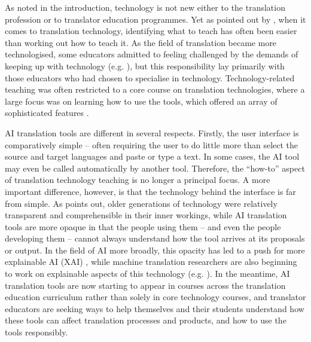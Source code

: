 \documentclass[output=paper]{langscibook}
\begin{document}
As noted in the introduction, technology is not new either to the translation profession or to translator education programmes. Yet as pointed out by \citet{kenny2020}, when it comes to translation technology, identifying what to teach has often been easier than working out how to teach it. As the field of translation became more technologised, some educators admitted to feeling challenged by the demands of keeping up with technology (e.g. \citealt{kenny2007, marshmanbowker12}), but this responsibility lay primarily with those educators who had chosen to specialise in technology. Technology-related teaching was often restricted to a core course on translation technologies, where a large focus was on learning how to use the tools, which offered an array of sophisticated features \citep{bowker2023}.

AI translation tools are different in several respects. Firstly, the user interface is comparatively simple – often requiring the user to do little more than select the source and target languages and paste or type a text. In some cases, the AI tool may even be called automatically by another tool. Therefore, the “how-to” aspect of translation technology teaching is no longer a principal focus. A more important difference, however, is that the technology behind the interface is far from simple. As \citet{kenny2018} points out, older generations of technology were relatively transparent and comprehensible in their inner workings, while AI translation tools are more opaque in that the people using them – and even the people developing them – cannot always understand how the tool arrives at its proposals or output. In the field of AI more broadly, this opacity has led to a push for more explainable AI (XAI) \citep{ridley24}, while machine translation researchers are also beginning to work on explainable aspects of this technology (e.g. \citealt{lankfordafliway23}). In the meantime, AI translation tools are now starting to appear in courses across the translation education curriculum rather than solely in core technology courses, and translator educators are seeking ways to help themselves and their students understand how these tools can affect translation processes and products, and how to use the tools responsibly.
\end{document}
